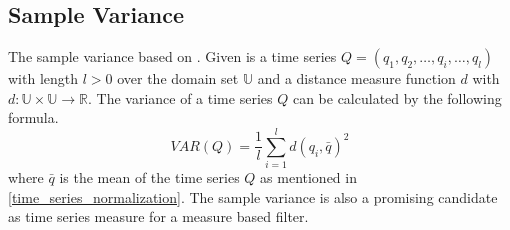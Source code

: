 \subsection{Sample Variance} \label{sample_variance}
The sample variance based on \cite{chan1983algorithms}. Given is a time series
$Q = (q_1, q_2, \dots, q_i, \dots, q_l)$ with length $l > 0$ over the domain set $\mathbb{U}$ and a distance measure
function $d$ with $d: \mathbb{U} \times \mathbb{U} \to \mathbb{R}$. The variance of a time series $Q$ can be
calculated by the following formula.
\begin{equation}
    VAR(Q) = \frac{1}{l}\sum \limits_{i=1}^{l} d(q_i, \bar{q})^2
\end{equation}
where $\bar{q}$ is the mean of the time series $Q$ as mentioned in \ref{time_series_normalization}. The sample variance
is also a promising candidate as time series measure for a measure based filter.
